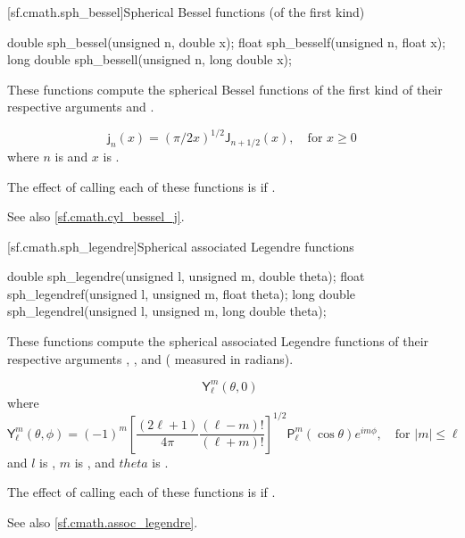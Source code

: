 [sf.cmath.sph_bessel]{Spherical Bessel functions (of the first kind)}%
%
%
%
%
%
\begin{itemdecl}
double       sph_bessel(unsigned n, double x);
float        sph_besself(unsigned n, float x);
long double  sph_bessell(unsigned n, long double x);
\end{itemdecl}

\begin{itemdescr}

\pnum\effects
These functions compute
the spherical Bessel functions of the first kind
of their respective arguments
 and .

\pnum\returns
\[%
  \mathsf{j}_n(x) =
  (\pi/2x)^{1\!/\!2} \mathsf{J}_{n + 1\!/\!2}(x),
	   \quad \mbox{for $x \ge 0$}
\]
where
$n$ is  and
$x$ is .

\pnum\remarks
The effect of calling each of these functions
is 
if .

\pnum See also \ref{sf.cmath.cyl_bessel_j}.
\end{itemdescr}

[sf.cmath.sph_legendre]{Spherical associated Legendre functions}%
%
%
%
%
%
%
\begin{itemdecl}
double       sph_legendre(unsigned l, unsigned m, double theta);
float        sph_legendref(unsigned l, unsigned m, float theta);
long double  sph_legendrel(unsigned l, unsigned m, long double theta);
\end{itemdecl}

\begin{itemdescr}
\pnum\effects
These functions compute the spherical associated Legendre functions
of their respective arguments
, , and  ( measured in radians).

\pnum\returns
\[%
  \mathsf{Y}_\ell^m(\theta, 0)
\;\]
where
\[%
  \mathsf{Y}_\ell^m(\theta, \phi) =
  (-1)^m \left[ \frac{(2 \ell + 1)}
                     {4 \pi}
	        \frac{(\ell - m)!}
	             {(\ell + m)!}
         \right]^{1/2}
	 \mathsf{P}_\ell^m
	 ( \cos\theta ) e ^ {i m \phi},
	   \quad \mbox{for $|m| \le \ell$}
\]
and
$l$ is ,
$m$ is , and
$theta$ is .

\pnum\remarks
The effect of calling each of these functions
is 
if .

\pnum See also \ref{sf.cmath.assoc_legendre}.
\end{itemdescr}

